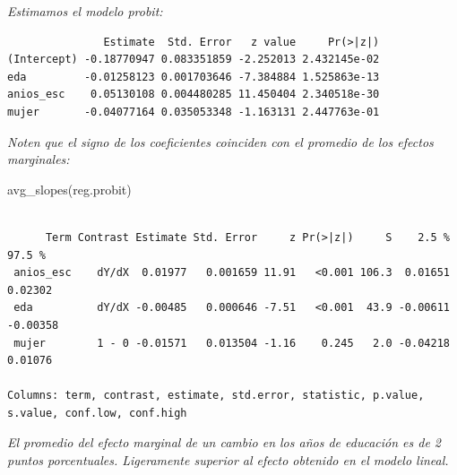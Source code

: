 \documentclass[
  letterpaper,
  DIV=11,
  numbers=noendperiod]{scrartcl}
\newenvironment{Shaded}{\begin{snugshade}}{\end{snugshade}}
\newcommand{\AttributeTok}[1]{\textcolor[rgb]{0.40,0.45,0.13}{#1}}
\newcommand{\FunctionTok}[1]{\textcolor[rgb]{0.28,0.35,0.67}{#1}}
\newcommand{\NormalTok}[1]{\textcolor[rgb]{0.00,0.23,0.31}{#1}}
\newcommand{\OtherTok}[1]{\textcolor[rgb]{0.00,0.23,0.31}{#1}}
\newcommand{\SpecialCharTok}[1]{\textcolor[rgb]{0.37,0.37,0.37}{#1}}
\newcommand{\StringTok}[1]{\textcolor[rgb]{0.13,0.47,0.30}{#1}}
\begin{document}
\emph{Estimamos el modelo probit:}

\begin{Shaded}
\end{Shaded}

\begin{verbatim}
               Estimate  Std. Error   z value     Pr(>|z|)
(Intercept) -0.18770947 0.083351859 -2.252013 2.432145e-02
eda         -0.01258123 0.001703646 -7.384884 1.525863e-13
anios_esc    0.05130108 0.004480285 11.450404 2.340518e-30
mujer       -0.04077164 0.035053348 -1.163131 2.447763e-01
\end{verbatim}

\emph{Noten que el signo de los coeficientes coinciden con el promedio
de los efectos marginales:}

\begin{Shaded}
\begin{Highlighting}[]
\FunctionTok{avg\_slopes}\NormalTok{(reg.probit)}
\end{Highlighting}
\end{Shaded}

\begin{verbatim}

      Term Contrast Estimate Std. Error     z Pr(>|z|)     S    2.5 %   97.5 %
 anios_esc    dY/dX  0.01977   0.001659 11.91   <0.001 106.3  0.01651  0.02302
 eda          dY/dX -0.00485   0.000646 -7.51   <0.001  43.9 -0.00611 -0.00358
 mujer        1 - 0 -0.01571   0.013504 -1.16    0.245   2.0 -0.04218  0.01076

Columns: term, contrast, estimate, std.error, statistic, p.value, s.value, conf.low, conf.high 
\end{verbatim}

\emph{El promedio del efecto marginal de un cambio en los años de
educación es de 2 puntos porcentuales. Ligeramente superior al efecto
obtenido en el modelo lineal.}
\end{document}
